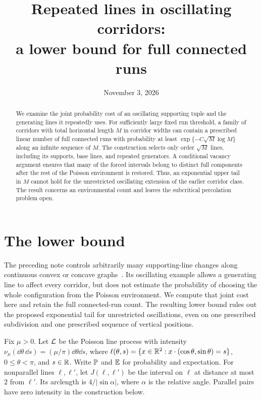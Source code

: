 \documentclass[11pt,letterpaper]{article}
\title{Repeated lines in oscillating corridors:\\a lower bound for full connected runs}
\author{}
\date{November 3, 2026}
\begin{document}
\maketitle
\begin{abstract}
We examine the joint probability cost of an oscillating supporting tuple and the generating lines it repeatedly uses. For sufficiently large fixed run threshold, a family of corridors with total horizontal length $M$ in corridor widths can contain a prescribed linear number of full connected runs with probability at least $\exp\{-C\sqrt M\log M\}$ along an infinite sequence of $M$. The construction selects only order $\sqrt M$ lines, including its supports, base lines, and repeated generators. A conditional vacancy argument ensures that many of the forced intervals belong to distinct full components after the rest of the Poisson environment is restored. Thus, an exponential upper tail in $M$ cannot hold for the unrestricted oscillating extension of the earlier corridor class. The result concerns an environmental count and leaves the subcritical percolation problem open.
\end{abstract}

\section{The lower bound}

The preceding note controls arbitrarily many supporting-line changes along continuous convex or concave graphs~\cite{CS26}. Its oscillating example allows a generating line to affect every corridor, but does not estimate the probability of choosing the whole configuration from the Poisson environment. We compute that joint cost here and retain the full connected-run count. The resulting lower bound rules out the proposed exponential tail for unrestricted oscillations, even on one prescribed subdivision and one prescribed sequence of vertical positions.

Fix $\mu>0$. Let $\cL$ be the Poisson line process with intensity $\nu_\mu(\dd\theta\,\dd s)=(\mu/\pi)\dd\theta\dd s$, where $\ell(\theta,s)=\{x\in\R^2:x\cdot(\cos\theta,\sin\theta)=s\}$, $0\le\theta<\pi$, and $s\in\R$. Write $\P$ and $\E$ for probability and expectation. For nonparallel lines $\ell,\ell'$, let $J(\ell,\ell')$ be the interval on $\ell$ at distance at most $2$ from $\ell'$. Its arclength is $4/|\sin\alpha|$, where $\alpha$ is the relative angle. Parallel pairs have zero intensity in the construction below.
\end{document}
